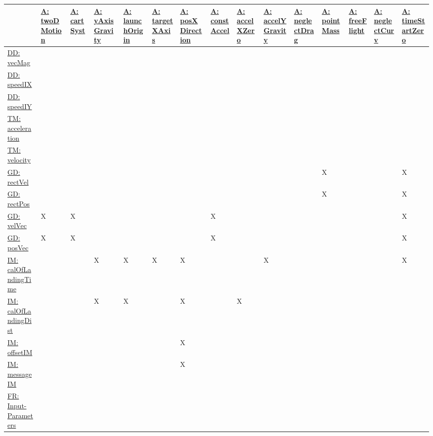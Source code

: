 \documentclass[12pt]{article}
\begin{document}
\begin{longtable}{l l l l l l l l l l l l l l l}
\toprule
\textbf{} & \textbf{\hyperref[twoDMotion]{A: twoDMotion}} & \textbf{\hyperref[cartSyst]{A: cartSyst}} & \textbf{\hyperref[yAxisGravity]{A: yAxisGravity}} & \textbf{\hyperref[launchOrigin]{A: launchOrigin}} & \textbf{\hyperref[targetXAxis]{A: targetXAxis}} & \textbf{\hyperref[posXDirection]{A: posXDirection}} & \textbf{\hyperref[constAccel]{A: constAccel}} & \textbf{\hyperref[accelXZero]{A: accelXZero}} & \textbf{\hyperref[accelYGravity]{A: accelYGravity}} & \textbf{\hyperref[neglectDrag]{A: neglectDrag}} & \textbf{\hyperref[pointMass]{A: pointMass}} & \textbf{\hyperref[freeFlight]{A: freeFlight}} & \textbf{\hyperref[neglectCurv]{A: neglectCurv}} & \textbf{\hyperref[timeStartZero]{A: timeStartZero}}
\\
\midrule
\endhead
\hyperref[DD:vecMag]{DD: vecMag} &  &  &  &  &  &  &  &  &  &  &  &  &  & 
\\
\hyperref[DD:speedIX]{DD: speedIX} &  &  &  &  &  &  &  &  &  &  &  &  &  & 
\\
\hyperref[DD:speedIY]{DD: speedIY} &  &  &  &  &  &  &  &  &  &  &  &  &  & 
\\
\hyperref[TM:acceleration]{TM: acceleration} &  &  &  &  &  &  &  &  &  &  &  &  &  & 
\\
\hyperref[TM:velocity]{TM: velocity} &  &  &  &  &  &  &  &  &  &  &  &  &  & 
\\
\hyperref[GD:rectVel]{GD: rectVel} &  &  &  &  &  &  &  &  &  &  & X &  &  & X
\\
\hyperref[GD:rectPos]{GD: rectPos} &  &  &  &  &  &  &  &  &  &  & X &  &  & X
\\
\hyperref[GD:velVec]{GD: velVec} & X & X &  &  &  &  & X &  &  &  &  &  &  & X
\\
\hyperref[GD:posVec]{GD: posVec} & X & X &  &  &  &  & X &  &  &  &  &  &  & X
\\
\hyperref[IM:calOfLandingTime]{IM: calOfLandingTime} &  &  & X & X & X & X &  &  & X &  &  &  &  & X
\\
\hyperref[IM:calOfLandingDist]{IM: calOfLandingDist} &  &  & X & X &  & X &  & X &  &  &  &  &  & 
\\
\hyperref[IM:offsetIM]{IM: offsetIM} &  &  &  &  &  & X &  &  &  &  &  &  &  & 
\\
\hyperref[IM:messageIM]{IM: messageIM} &  &  &  &  &  & X &  &  &  &  &  &  &  & 
\\
\hyperref[inputParams]{FR: Input-Parameters} &  &  &  &  &  &  &  &  &  &  &  &  &  & 
\\

\end{longtable}
\end{document}
